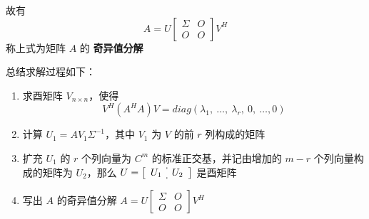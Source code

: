             故有
            \begin{equation*}
                A = U\begin{bmatrix}
                    \varSigma & O \\ O & O 
                \end{bmatrix}V^H
            \end{equation*}
            称上式为矩阵 $A$ 的 \textbf{奇异值分解}

            \par 总结求解过程如下：
            \begin{enumerate}
                \item 求酉矩阵 $V_{n \times n}$，使得
                    \begin{equation*}
                        V^H(A^HA)V = diag(\lambda_1, \ \dots, \ \lambda_r, \ 0, \ \dots, 0)
                    \end{equation*}
                \item 计算 $U_1 = AV_1\varSigma^{-1}$，其中 $V_1$ 为 $V$ 的前 $r$ 列构成的矩阵
                \item 扩充 $U_1$ 的 $r$ 个列向量为 $C^m$ 的标准正交基，并记由增加的 $m-r$ 个列向量构成的矩阵为 $U_2$，那么 $U = \left[\begin{array}{c:c}
                    U_1 & U_2
                \end{array}\right]$ 是酉矩阵
                \item 写出 $A$ 的奇异值分解 $A = U \begin{bmatrix}
                    \varSigma & O \\ O & O 
                \end{bmatrix}V^H$ 
            \end{enumerate}

